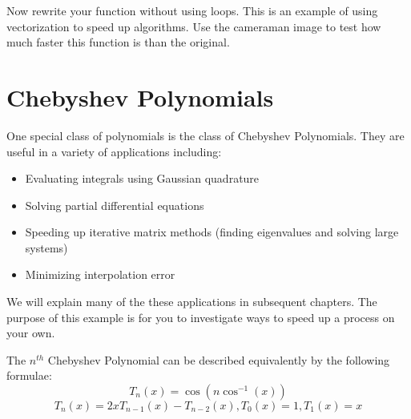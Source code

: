 \begin{problem}
Now rewrite your function without using loops. This is an example of using vectorization to speed up algorithms. Use the cameraman image to test how much faster this function is than the original.
\end{problem}

\section*{Chebyshev Polynomials}

One special class of polynomials is the class of Chebyshev Polynomials. They are useful in a variety of applications including:
\begin{itemize}
\item Evaluating integrals using Gaussian quadrature
\item Solving partial differential equations
\item Speeding up iterative matrix methods (finding eigenvalues and solving large systems)
\item Minimizing interpolation error
\end{itemize}

We will explain many of the these applications in subsequent chapters. The purpose of this example is for you to investigate ways to speed up a process on your own.

The $n^{th}$ Chebyshev Polynomial can be described equivalently by the following formulae\footnotemark :
\begin{equation*}
T_n(x) = \cos(n \cos^{-1}(x))
\end{equation*}
\begin{equation*}
T_n(x) = 2xT_{n-1}(x) - T_{n-2}(x), T_0(x) = 1, T_1(x) = x
\end{equation*}


